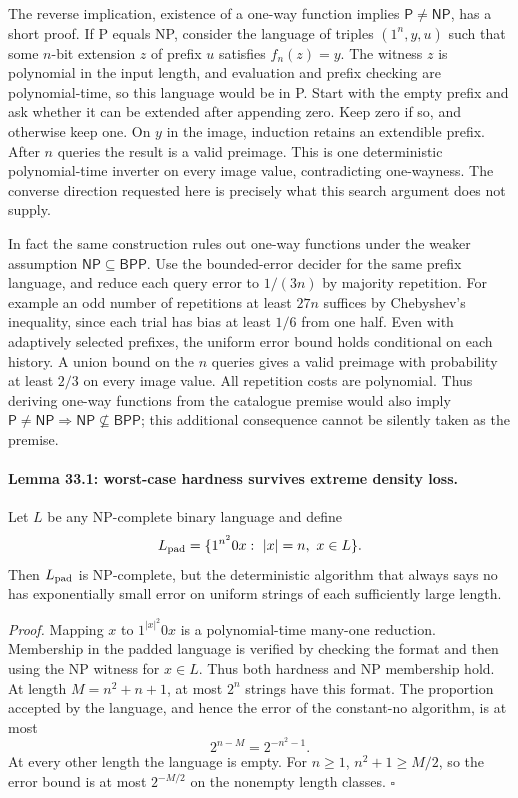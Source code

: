 \documentclass[11pt]{article}
\begin{document}
The reverse implication, existence of a one-way function implies
$\mathsf P\ne\mathsf{NP}$, has a short proof. If P equals NP, consider the
language of triples $(1^n,y,u)$ such that some $n$-bit extension $z$ of
prefix $u$ satisfies $f_n(z)=y$. The witness $z$ is polynomial in the
input length, and evaluation and prefix checking are polynomial-time, so
this language would be in P. Start with the empty prefix and ask whether
it can be extended after appending zero. Keep zero if so, and otherwise
keep one. On $y$ in the image, induction retains an extendible prefix.
After $n$ queries the result is a valid preimage. This is one deterministic
polynomial-time inverter on every image value, contradicting one-wayness.
The converse direction requested here is precisely what this search
argument does not supply.

In fact the same construction rules out one-way functions under the weaker
assumption $\mathsf{NP}\subseteq\mathsf{BPP}$. Use the bounded-error decider
for the same prefix language, and reduce each query error to $1/(3n)$ by
majority repetition. For example an odd number of repetitions at least
$27n$ suffices by Chebyshev's inequality, since each trial has bias at
least $1/6$ from one half. Even with adaptively selected prefixes, the
uniform error bound holds conditional on each history. A union bound on
the $n$ queries gives a valid preimage with probability at least $2/3$
on every image value. All repetition costs are polynomial. Thus deriving
one-way functions from the catalogue premise would also imply
$\mathsf P\ne\mathsf{NP}\Longrightarrow\mathsf{NP}\not\subseteq\mathsf{BPP}$;
this additional consequence cannot be silently taken as the premise.

\paragraph{Lemma 33.1: worst-case hardness survives extreme density loss.}
Let $L$ be any NP-complete binary language and define
\begin{equation}\label{r33:padding}
 L_{\rm pad}=\{1^{n^2}0x:\ |x|=n,\ x\in L\}.
\end{equation}
Then $L_{\rm pad}$ is NP-complete, but the deterministic algorithm that
always says no has exponentially small error on uniform strings of each
sufficiently large length.

\emph{Proof.} Mapping $x$ to $1^{|x|^2}0x$ is a polynomial-time many-one
reduction. Membership in the padded language is verified by checking the
format and then using the NP witness for $x\in L$. Thus both hardness and
NP membership hold. At length $M=n^2+n+1$, at most $2^n$ strings have
this format. The proportion accepted by the language, and hence the error
of the constant-no algorithm, is at most
\[
                 2^{n-M}=2^{-n^2-1}.
\]
At every other length the language is empty. For $n\ge1$, $n^2+1\ge M/2$,
so the error bound is at most $2^{-M/2}$ on the nonempty length classes.
\hfill$\square$
\end{document}
